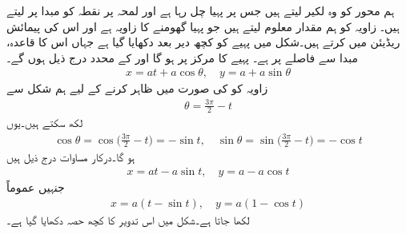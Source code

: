 ہم محور  کو وہ لکیر لیتے ہیں جس پر پہیا چل رہا ہے اور لمحہ  پر نقطہ  کو مبدا پر لیتے ہیں۔  زاویہ  کو  ہم مقدار معلوم لیتے ہیں جو پہیا  گھومنے کا زاویہ ہے اور اس کی  پیمائش ریڈیئن میں  کرتے ہیں۔شکل  میں پہیے کو کچھ دیر بعد دکھایا گیا ہے جہاں اس کا قاعدہ، مبدا سے  فاصلے  پر ہے۔ پہیے کا مرکز  پر  ہو گا اور  کے محدد درج ذیل ہوں گے۔
\begin{align*}
x=at+a\cos \theta,\quad y=a+a\sin \theta 
\end{align*}
زاویہ  کو  کی صورت میں ظاہر کرنے کے لیے ہم شکل سے 
\begin{align*}
\theta=\frac{3\pi}{2}-t
\end{align*}
لکھ سکتے ہیں۔یوں
\begin{align*}
\cos\theta=\cos\big(\frac{3\pi}{2}-t\big)=-\sin t,\quad \sin\theta=\sin\big(\frac{3\pi}{2}-t\big)=-\cos t
\end{align*}
ہو گا۔درکار مساوات  درج ذیل ہیں
\begin{align*}
x=at-a\sin t,\quad y=a-a\cos t
\end{align*}
 جنہیں عموماً
\begin{align}\label{مساوات_مخروط_تدویر_الف}
x=a(t-\sin t),\quad y=a(1-\cos t)
\end{align}
لکھا جاتا ہے۔شکل  میں اس تدویر کا کچھ حصہ دکھایا گیا ہے۔
